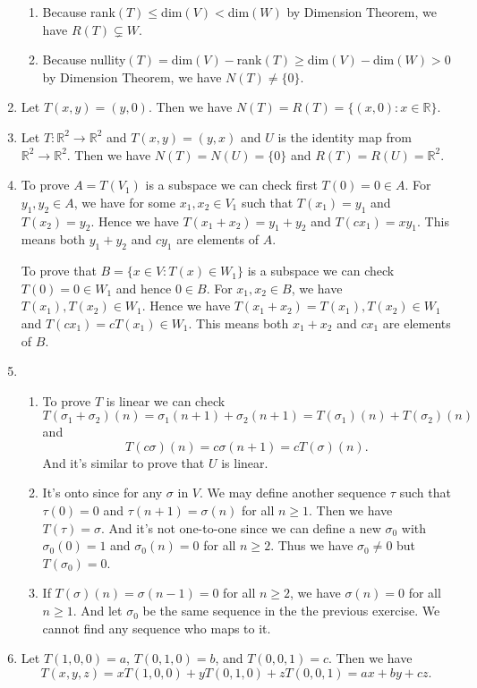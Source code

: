 \begin{enumerate}
\begin{enumerate}
\item Because rank$(T)\leq $dim$(V)<$dim$(W)$ by Dimension Theorem, we have $R(T)\subsetneq W$.
\item Because nullity$(T)=$dim$(V)-$rank$(T)\geq $dim$(V)-$dim$(W)>0$ by Dimension Theorem, we have $N(T)\neq \{0\}$.
\end{enumerate}
\item Let $T(x,y)=(y,0)$. Then we have $N(T)=R(T)=\{(x,0):x\in \mathbb{R}\}$.
\item Let $T:\mathbb{R}^2\rightarrow \mathbb{R}^2$ and $T(x,y)=(y,x)$ and $U$ is the identity map from $\mathbb{R}^2\rightarrow \mathbb{R}^2$. Then we have $N(T)=N(U)=\{0\}$ and $R(T)=R(U)=\mathbb{R}^2$.
\item To prove $A=T(V_1)$ is a subspace we can check first $T(0)=0\in A$. For $y_1,y_2\in A$, we have for some $x_1,x_2\in V_1$ such that $T(x_1)=y_1$ and $T(x_2)=y_2$. Hence we have $T(x_1+x_2)=y_1+y_2$ and $T(cx_1)=xy_1$. This means both $y_1+y_2$ and $cy_1$ are elements of $A$.

To prove that $B=\{x\in V:T(x)\in W_1\}$ is a subspace we can check $T(0)=0\in W_1$ and hence $0\in B$. For $x_1,x_2\in B$, we have $T(x_1),T(x_2)\in W_1$. Hence we have $T(x_1+x_2)=T(x_1),T(x_2)\in W_1$ and $T(cx_1)=cT(x_1)\in W_1$. This means both $x_1+x_2$ and $cx_1$ are elements of $B$.
\item \begin{enumerate}
\item To prove $T$ is linear we can check \[T(\sigma_1+\sigma_2)(n)=\sigma_1(n+1)+\sigma_2(n+1)=T(\sigma_1)(n)+T(\sigma_2)(n)\]
and
\[T(c\sigma )(n)=c\sigma (n+1)=cT(\sigma)(n).\]
And it's similar to prove that $U$ is linear.
\item It's onto since for any $\sigma $ in $V$. We may define another sequence $\tau $ such that $\tau (0)=0$ and $\tau (n+1)=\sigma (n)$ for all $n\geq 1$. Then we have $T(\tau )=\sigma $. And it's not one-to-one since we can define a new $\sigma_0 $ with $\sigma_0 (0)=1$ and $\sigma_0 (n)=0$ for all $n\geq 2$. Thus we have $\sigma_0 \neq 0$ but $T(\sigma_0 )=0$.
\item If $T(\sigma )(n)=\sigma (n-1)=0$ for all $n\geq 2$, we have $\sigma (n)=0$ for all $n\geq 1$. And let $\sigma_0 $ be the same sequence in the the previous exercise. We cannot find any sequence who maps to it.
\end{enumerate}
\item Let $T(1,0,0)=a$, $T(0,1,0)=b$, and $T(0,0,1)=c$. Then we have \[T(x,y,z)=xT(1,0,0)+yT(0,1,0)+zT(0,0,1)=ax+by+cz.\]


\end{enumerate}
